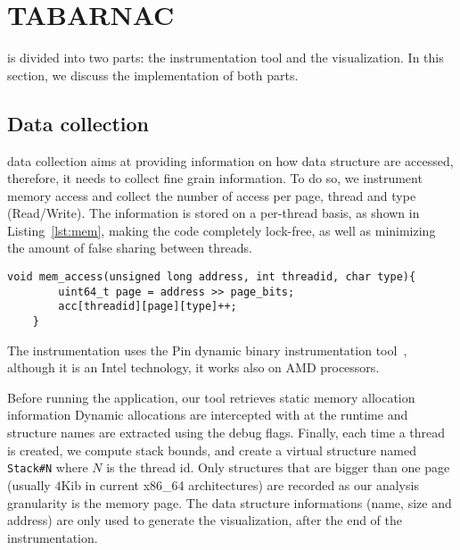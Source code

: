 
\section{TABARNAC}
\label{sec:design}

\TABARNAC is divided into two parts: the instrumentation tool and the
visualization. In this section, we discuss the implementation of both parts.

\subsection{Data collection}
\label{sec:design-impl}

\TABARNAC data collection aims at providing information on how data structure
are accessed, therefore, it needs to collect fine grain information. To do so,
we instrument memory access and collect the number of access per page, thread
and type (Read/Write). The information is stored on a per-thread basis, as
shown in Listing~\ref{lst:mem}, making the code completely lock-free, as well
as minimizing the amount of false sharing between threads.

\newpage
\begin{lstlisting}[caption={Code executed on each memory access. The \texttt{address}, \texttt{threadid} and \texttt{type} parameters are provided by Pin.},label=lst:mem]
	void mem_access(unsigned long address, int threadid, char type){
		uint64_t page = address >> page_bits;
		acc[threadid][page][type]++;
	}

\end{lstlisting}

The instrumentation uses the Pin dynamic binary instrumentation
tool~\cite{Luk05Pin}, although it is an Intel technology, it works also on AMD
processors.

Before running the application, our tool retrieves static memory allocation
information %
Dynamic allocations are intercepted with at the runtime and structure names
are extracted using the debug flags.
Finally, each time a thread is created, we compute
stack bounds, and create a virtual structure named \texttt{Stack\#N} where
$N$ is the thread id. Only structures that are bigger than one page (usually
$4$Kib in current x86\_64 architectures) are recorded as our
analysis granularity is the memory page. The data structure informations (name,
size and address) are only used to generate the visualization, after the end
of the instrumentation.

